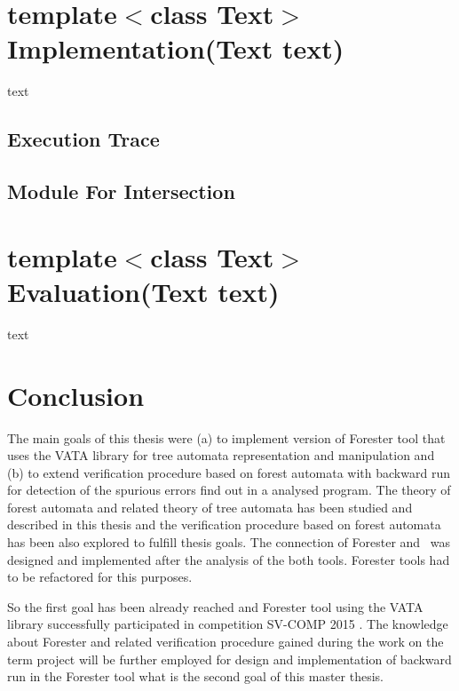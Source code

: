 \chapter{template$<$class Text$>$ Implementation(Text text)}
\label{ch:impl}
text

\section{Execution Trace}
\section{Module For Intersection}

\chapter{template$<$class Text$>$ Evaluation(Text text)}
\label{ch:eval}
text

\chapter{Conclusion}
\label{ch:concl}

The main goals of this thesis were (a) to implement version of Forester tool that uses the VATA library for tree automata representation and manipulation
and (b) to extend verification procedure based on forest automata with backward run for detection of the spurious errors find out in a analysed program.
The theory of forest automata and related theory of tree automata has been studied and described in this thesis and the verification procedure
based on forest automata has been also explored to fulfill thesis goals.
The connection of Forester and \vata\ was designed and implemented after the analysis of the both tools.
Forester tools had to be refactored for this purposes.

So the first goal has been already reached and Forester tool using the VATA library successfully participated in competition SV-COMP 2015 \cite{www:svcomp}.
The knowledge about Forester and related verification procedure gained during the work on the term project will be further employed for design
and implementation of backward run in the Forester tool what is the second goal of this master thesis. 

